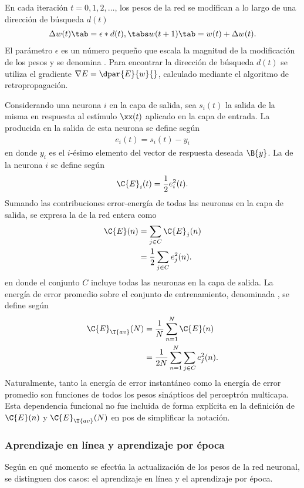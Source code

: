 En cada iteración $t=0,1,2,\ldots$, los pesos de la red
se modifican a lo largo de una dirección de búsqueda
$d(t)$ %
%
\begin{align}
  \Delta w(t)\tab=\epsilon * d(t), \tabs w(t+1) \tab= w(t)+\Delta w(t).
\end{align}
%
El parámetro $\epsilon$ es un número pequeño que escala la magnitud de
la modificación de los pesos y se denomina .  Para encontrar la dirección de búsqueda $d(t)$ se
utiliza el gradiente $\nabla{}E=\dpar{E}{w}{}$, calculado mediante el
algoritmo de retropropagación.

Considerando una neurona $i$ en la capa de salida, sea $s_i(t)$ la
salida de la misma en respuesta al estímulo $\xx(t)$ aplicado en la
capa de entrada. La  producida en la salida de esta
neurona se define según
%
\begin{align}\label{4.2}
  e_i(t)=s_{i}(t)-y_{i}
\end{align}
%
en donde $y_{i}$ es el $i$-ésimo elemento del vector de respuesta
deseada $\B{y}$. La  de la neurona
$i$ se define según
%
\begin{align}
\label{4.3}
  \C{E}_i(t)=\frac{1}{2}e^2_i(t).
\end{align}
%
Sumando las contribuciones error-energía de todas las neuronas en la
capa de salida, se expresa la 
de la red entera como
%
\begin{align}
\label{4.4}
  \C{E}(n)&=\sum_{j\in C}\C{E}_j(n) \\
  &=\frac{1}{2}\sum_{j\in C}e^2_j(n).
\end{align}
%
en donde el conjunto $C$ incluye todas las neuronas en la capa de
salida. La energía de error promedio sobre el conjunto de entrenamiento,
denominada , se define según
%
\begin{align}
\label{4.5}
  \C{E}_{\T{av}}(N)&=\frac{1}{N}\sum_{n=1}^N\C{E}(n) \\
  &=\frac{1}{2N} \sum_{n=1}^N \sum_{j\in C}e^2_j(n).
\end{align}
%
Naturalmente, tanto la energía de error instantáneo como la energía de
error promedio son funciones de todos los pesos sinápticos del
perceptrón multicapa. Esta dependencia funcional no fue incluida de
forma explícita en la definición de $\C{E}(n)$ y $\C{E}_{\T{av}}(N)$
en pos de simplificar la notación.

%
\subsubsection{Aprendizaje en línea y aprendizaje por época}
%
Según en qué momento se efectúa la actualización de los pesos de la
red neuronal, se distinguen dos casos: el aprendizaje en línea y el
aprendizaje por época.


